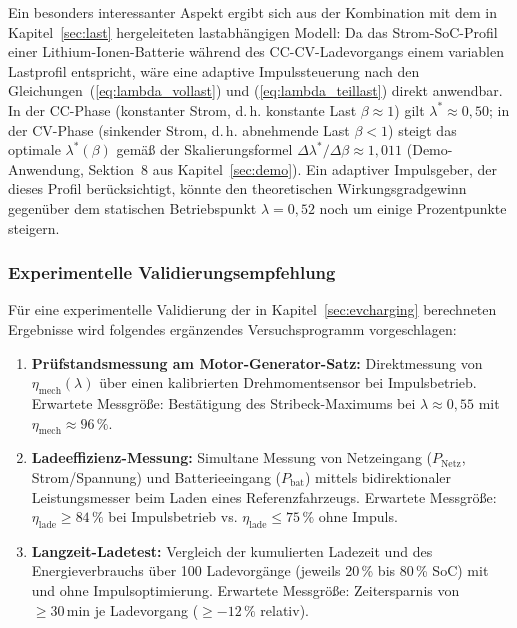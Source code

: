﻿\documentclass[a4paper,12pt]{article}
\begin{document}
Ein besonders interessanter Aspekt ergibt sich aus der Kombination
mit dem in Kapitel~\ref{sec:last} hergeleiteten lastabhängigen Modell:
Da das Strom-SoC-Profil einer Lithium-Ionen-Batterie während des
CC-CV-Ladevorgangs einem variablen Lastprofil entspricht, wäre eine
adaptive Impulssteuerung nach den Gleichungen~(\ref{eq:lambda_vollast})
und (\ref{eq:lambda_teillast}) direkt anwendbar. In der CC-Phase (konstanter
Strom, d.\,h. konstante Last $\beta \approx 1$) gilt $\lambda^* \approx 0{,}50$;
in der CV-Phase (sinkender Strom, d.\,h. abnehmende Last $\beta < 1$)
steigt das optimale $\lambda^*(\beta)$ gemäß der Skalierungsformel
$\Delta\lambda^*/\Delta\beta \approx 1{,}011$ (Demo-Anwendung, Sektion~8
aus Kapitel~\ref{sec:demo}). Ein adaptiver Impulsgeber, der dieses Profil
berücksichtigt, könnte den theoretischen Wirkungsgradgewinn gegenüber dem
statischen Betriebspunkt $\lambda = 0{,}52$ noch um einige Prozentpunkte
steigern.

\subsubsection*{Experimentelle Validierungsempfehlung}

Für eine experimentelle Validierung der in Kapitel~\ref{sec:evcharging}
berechneten Ergebnisse wird folgendes ergänzendes Versuchsprogramm vorgeschlagen:

\begin{enumerate}
  \item \textbf{Prüfstandsmessung am Motor-Generator-Satz:} Direktmessung
    von $\eta_\text{mech}(\lambda)$ über einen kalibrierten Drehmomentsensor
    bei Impulsbetrieb. Erwartete Messgröße: Bestätigung des Stribeck-Maximums
    bei $\lambda \approx 0{,}55$ mit $\eta_\text{mech} \approx 96\,\%$.

  \item \textbf{Ladeeffizienz-Messung:} Simultane Messung von Netzeingang
    ($P_\text{Netz}$, Strom/Spannung) und Batterieeingang ($P_\text{bat}$)
    mittels bidirektionaler Leistungsmesser beim Laden eines Referenzfahrzeugs.
    Erwartete Messgröße: $\eta_\text{lade} \geq 84\,\%$ bei Impulsbetrieb
    vs. $\eta_\text{lade} \leq 75\,\%$ ohne Impuls.

  \item \textbf{Langzeit-Ladetest:} Vergleich der kumulierten Ladezeit
    und des Energieverbrauchs über 100 Ladevorgänge (jeweils 20\,\%
    bis 80\,\% SoC) mit und ohne Impulsoptimierung. Erwartete Messgröße:
    Zeitersparnis von $\geq 30\,\text{min}$ je Ladevorgang
    ($\geq -12\,\%$ relativ).
\end{enumerate}
\end{document}
